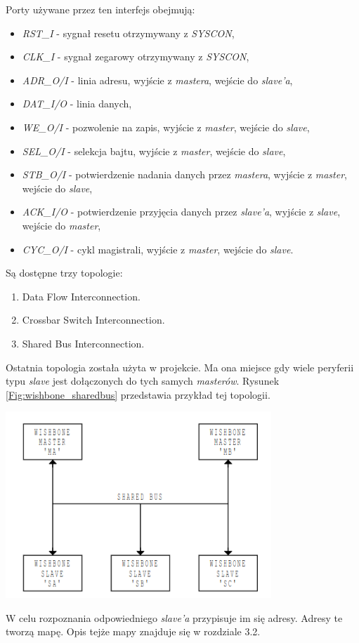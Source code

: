 \documentclass[11pt,a4paper]{article}
\begin{document}
			Porty używane przez ten interfejs obejmują\cite{wishbone_tutorial}:
			\begin{itemize}
				\item \textit{RST\_I} - sygnał resetu otrzymywany z \textit{SYSCON},
				\item \textit{CLK\_I} - sygnał zegarowy otrzymywany z \textit{SYSCON},
				\item \textit{ADR\_O/I} - linia adresu, wyjście z \textit{mastera}, wejście do \textit{slave'a},
				\item \textit{DAT\_I/O} - linia danych,
				\item \textit{WE\_O/I} - pozwolenie na zapis, wyjście z \textit{master}, wejście do \textit{slave},
				\item \textit{SEL\_O/I} - selekcja bajtu, wyjście z \textit{master}, wejście do \textit{slave},
				\item \textit{STB\_O/I} - potwierdzenie nadania danych przez \textit{mastera}, wyjście z \textit{master}, wejście do \textit{slave},
				\item \textit{ACK\_I/O} - potwierdzenie przyjęcia danych przez \textit{slave'a}, wyjście z \textit{slave}, wejście do \textit{master},
				\item \textit{CYC\_O/I} - cykl magistrali, wyjście z \textit{master}, wejście do \textit{slave}.
			\end{itemize}
			
		Są dostępne trzy topologie:
			\begin{enumerate}
				\item Data Flow Interconnection.
				\item Crossbar Switch Interconnection.
				\item Shared Bus Interconnection.
			\end{enumerate}
			Ostatnia topologia została użyta w projekcie. Ma ona miejsce gdy wiele peryferii typu \textit{slave} jest dołączonych do tych samych \textit{masterów}. Rysunek \ref{Fig:wishbone_sharedbus} przedstawia przykład tej topologii.
			\begin{samepage}

				\nopagebreak
				\begin{center}
					\includegraphics[width=10cm]{./rysunki/wishbone_sharedbus.png}
				\end{center}
			\end{samepage}
		W celu rozpoznania odpowiedniego \textit{slave'a} przypisuje im się adresy. Adresy te tworzą mapę. Opis tejże mapy znajduje się w rozdziale 3.2.
\end{document}
